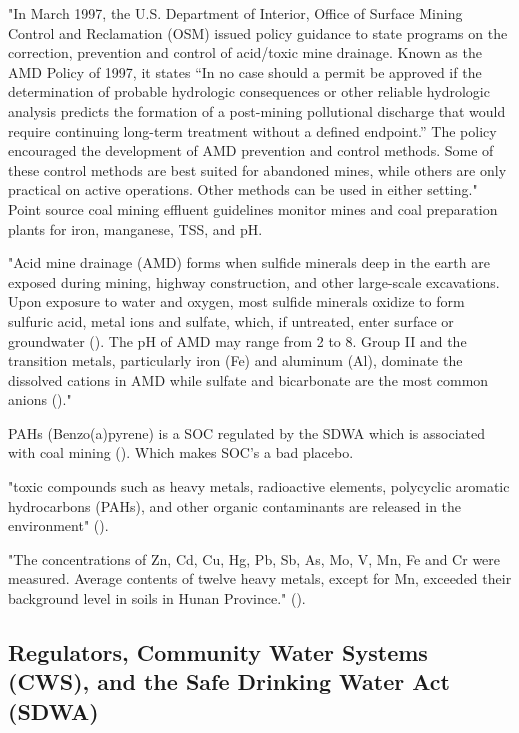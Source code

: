 \documentclass{article}
\begin{document}
"In March 1997, the U.S. Department of Interior, Office of Surface
Mining Control and Reclamation (OSM) issued policy guidance to state
programs on the correction, prevention and control of acid/toxic mine
drainage. Known as the AMD Policy of 1997, it states “In no case should
a permit be approved if the determination of probable hydrologic
consequences or other reliable hydrologic analysis predicts the formation
of a post-mining pollutional discharge that would require continuing
long-term treatment without a defined endpoint.” The policy
encouraged the development of AMD prevention and control methods.
Some of these control methods are best suited for abandoned mines,
while others are only practical on active operations. Other methods can
be used in either setting."\cite{skousen2019acid} Point source coal mining effluent guidelines monitor mines and coal preparation plants for iron, manganese, TSS, and pH.


"Acid mine drainage (AMD) forms when sulfide minerals deep in the earth are exposed during mining, highway construction, and other large-scale excavations. Upon exposure to water and oxygen, most sulfide minerals oxidize to form sulfuric acid, metal ions and sulfate, which, if untreated, enter surface or groundwater (\cite{akcil2006acid}). The pH of AMD may range from 2 to 8. Group II and the transition metals, particularly iron (Fe) and aluminum (Al), dominate the dissolved cations in AMD while sulfate and bicarbonate are the most common anions (\cite{skousen1998handbook})."\cite{skousen2019acid}

PAHs (Benzo(a)pyrene) is a SOC regulated by the SDWA which is associated with coal mining (\cite{boente2020benzo}). Which makes SOC's a bad placebo.

"toxic compounds such as heavy metals, radioactive elements, polycyclic aromatic hydrocarbons (PAHs), and other organic contaminants are released in the environment" (\cite{rouhani2023overview}).

"The concentrations of Zn, Cd, Cu, Hg, Pb, Sb, As, Mo, V, Mn, Fe and Cr were measured. Average contents of twelve heavy metals, except for Mn, exceeded their background level in soils in Hunan Province." (\cite{liang2017spatial}).

\subsection{Regulators, Community Water Systems (CWS), and the Safe Drinking Water Act (SDWA)}
\end{document}
